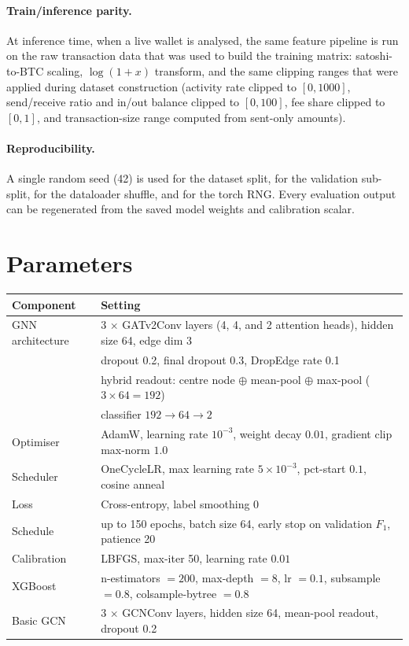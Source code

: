 \documentclass[11pt]{article}
\begin{document}
\paragraph{Train/inference parity.}
At inference time, when a live wallet is analysed, the same feature pipeline is run on the raw transaction data
that was used to build the training matrix: satoshi-to-BTC scaling, $\log(1+x)$ transform, and the same clipping
ranges that were applied during dataset construction (activity rate clipped to $[0, 1000]$, send/receive ratio and
in/out balance clipped to $[0, 100]$, fee share clipped to $[0, 1]$, and transaction-size range computed from
sent-only amounts).

\paragraph{Reproducibility.}
A single random seed (42) is used for the dataset split, for the validation sub-split, for the dataloader shuffle,
and for the torch RNG. Every evaluation output can be regenerated from the saved model weights and calibration
scalar.

\section{Parameters}\label{sec:params}

\begin{table}[h]
\centering\small
\begin{tabularx}{\linewidth}{l Y}
\toprule
\textbf{Component} & \textbf{Setting} \\
\midrule
GNN architecture     & 3 $\times$ GATv2Conv layers (4, 4, and 2 attention heads), hidden size 64, edge dim 3 \\
                     & dropout 0.2, final dropout 0.3, DropEdge rate 0.1 \\
                     & hybrid readout: centre node $\oplus$ mean-pool $\oplus$ max-pool ($3 \times 64 = 192$) \\
                     & classifier $192 \rightarrow 64 \rightarrow 2$ \\
Optimiser            & AdamW, learning rate $10^{-3}$, weight decay $0.01$, gradient clip max-norm $1.0$ \\
Scheduler            & OneCycleLR, max learning rate $5 \times 10^{-3}$, pct-start $0.1$, cosine anneal \\
Loss                 & Cross-entropy, label smoothing $0$ \\
Schedule             & up to 150 epochs, batch size 64, early stop on validation $F_1$, patience 20 \\
Calibration          & LBFGS, max-iter 50, learning rate $0.01$ \\
XGBoost              & n-estimators $= 200$, max-depth $= 8$, lr $= 0.1$, subsample $= 0.8$, colsample-bytree $= 0.8$ \\
Basic GCN            & 3 $\times$ GCNConv layers, hidden size 64, mean-pool readout, dropout 0.2 \\
\bottomrule
\end{tabularx}
\end{table}
\end{document}
